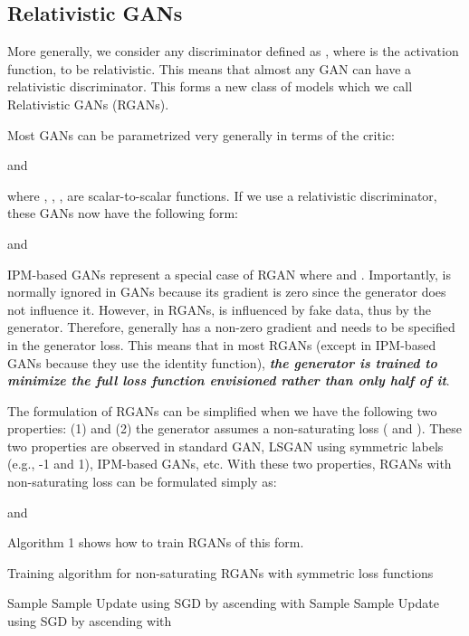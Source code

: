 \documentclass{article}
\begin{document}
\subsection{Relativistic GANs}

More generally, we consider any discriminator defined as , where  is the activation function, to be relativistic. This means that almost any GAN can have a relativistic discriminator. This forms a new class of models which we call Relativistic GANs (RGANs). 

Most GANs can be parametrized very generally in terms of the critic:

and

where , , ,  are scalar-to-scalar functions. If we use a relativistic discriminator, these GANs now have the following form:

and

IPM-based GANs represent a special case of RGAN where  and . Importantly,  is normally ignored in GANs because its gradient is zero since the generator does not influence it. However, in RGANs,  is influenced by fake data, thus by the generator. Therefore,  generally has a non-zero gradient and needs to be specified in the generator loss. This means that in most RGANs (except in IPM-based GANs because they use the identity function), \textbf{\textit{the generator is trained to minimize the full loss function envisioned rather than only half of it}}.

The formulation of RGANs can be simplified when we have the following two properties: (1)  and (2) the generator assumes a non-saturating loss ( and ). These two properties are observed in standard GAN, LSGAN using symmetric labels (e.g., -1 and 1), IPM-based GANs, etc. With these two properties, RGANs with non-saturating loss can be formulated simply as:

and

Algorithm 1 shows how to train RGANs of this form.
\begin{algorithm}  
	\caption{Training algorithm for non-saturating RGANs with symmetric loss functions
		\label{alg:1}}
	\begin{algorithmic}
		\For{}
		\State Sample 
		\State Sample 
		\State Update  using SGD by ascending with 
		\EndFor 
		\State Sample 
		\State Sample 
		\State Update  using SGD by ascending with 
		\EndWhile
	\end{algorithmic}
\end{algorithm}
\end{document}
